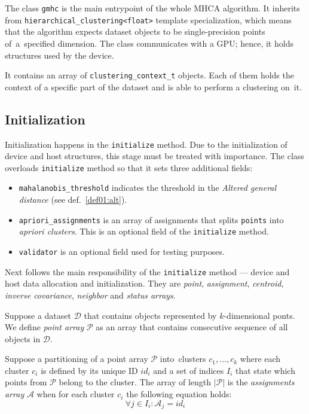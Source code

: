 The class \texttt{gmhc} is the main entrypoint of the whole MHCA algorithm. It inherits from \texttt{hierarchical\_clustering<float>} template specialization, which means that the algorithm expects dataset objects to be single-precision points of~a~specified dimension. The class communicates
with a GPU; hence, it holds structures used by the device.

It contains an array of \texttt{clustering\_context\_t} objects. Each of them holds the context of a specific part of the dataset and is able to perform a clustering on~it.

\subsection{Initialization}

Initialization happens in the \texttt{initialize} method. Due to the initialization of device and host structures, this stage must be treated with importance.
The class overloads \texttt{initialize} method so that it sets three additional fields:
\begin{itemize}
	\item \texttt{mahalanobis\_threshold} indicates the threshold in the \emph{Altered general distance} (see def.~\ref{def01:alt}).
	
	\item\texttt{apriori\_assignments}  is an array of assignments that splits \texttt{points} into \emph{apriori clusters}. This is an optional field of the \texttt{initialize} method.
	
	\item \texttt{validator} is an optional field used for testing purposes.
\end{itemize}

Next follows the main responsibility of the \texttt{initialize} method --- device and host data allocation and initialization. They are \emph{point}, \emph{assignment}, \emph{centroid}, \emph{inverse covariance}, \emph{neighbor} and \emph{status arrays}.

\begin{defn}
	Suppose a dataset $\mathcal{D}$ that contains objects represented by $k$-di\-men\-si\-onal ponts. We define \emph{point array} $\mathcal{P}$ as an array that contains consecutive sequence of all objects in $\mathcal{D}$.
	\label{def03:point}
\end{defn}

\begin{defn}
	Suppose a partitioning of a point array $\mathcal{P}$ into~clusters $c_1,\dots,c_k$ where each cluster $c_i$ is defined by its unique ID $id_i$ and a set of indices $I_i$ that state which points from $\mathcal{P}$ belong to the cluster. The array of length $|\mathcal{P}|$ is the \emph{assignments array} $\mathcal{A}$ when for each cluster $c_i$ the following equation holds:
	$${\forall j \in I_i : \mathcal{A}_j = id_i}$$
	\label{def03:assign}
\end{defn}

